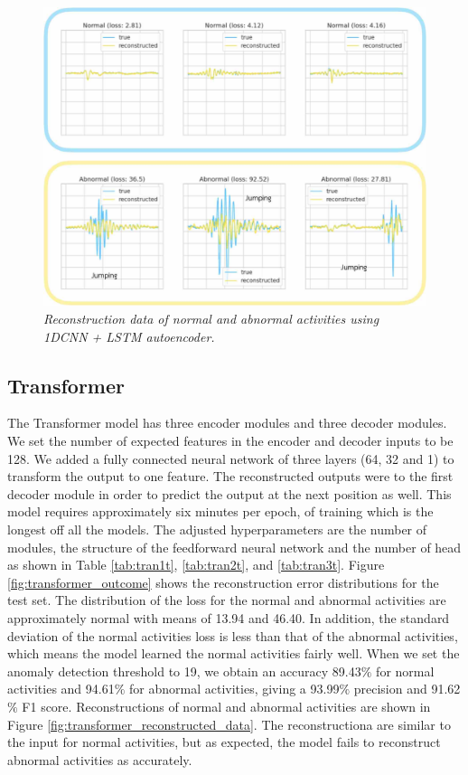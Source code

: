 \begin{figure}[H]
  \centering
  \caption[Reconstruction data of normal and abnormal activities using 1DCNN + LSTM autoencoder.]{\emph{Reconstruction data of normal and abnormal activities using 1DCNN + LSTM autoencoder.}} \label{fig:autoencoder_cnnlstm_reconstructed_data}
  \includegraphics[scale = 0.22]{figures/autoencoder_cnnlstm_reconstructed_data.jpg}
\end{figure}


\subsection{Transformer}
The Transformer model has three encoder modules and three decoder modules. We set the number of expected features in the encoder and decoder inputs to be 128. We added a fully connected neural network of three layers (64, 32 and 1) to transform the output to one feature. The reconstructed outputs were to the first decoder module in order to predict the output at the next position as well. This model requires approximately six minutes per epoch, of training which is the longest off all the models. The adjusted hyperparameters are the number of modules, the structure of the feedforward neural network and the number of head as shown in Table \ref{tab:tran1t}, \ref{tab:tran2t}, and \ref{tab:tran3t}. Figure \ref{fig:transformer_outcome} shows the reconstruction error distributions for the test set. The distribution of the loss for the normal and abnormal activities are approximately normal with means of 13.94 and 46.40. In addition, the standard deviation of the normal activities loss is less than that of the abnormal activities, which means the model learned the normal activities fairly well. When we set the anomaly detection threshold to 19, we obtain an accuracy 89.43$\%$ for normal activities and 94.61$\%$ for abnormal activities, giving a 93.99$\%$ precision and 91.62$\%$ F1 score. Reconstructions of normal and abnormal activities are shown in Figure \ref{fig:transformer_reconstructed_data}. The reconstructiona are similar to the input for normal activities, but as expected, the model fails to reconstruct abnormal activities as accurately.

